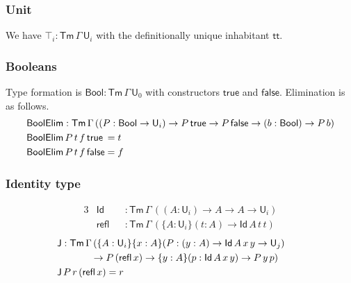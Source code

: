 \documentclass[acmsmall,screen,review]{acmart}
\newcommand{\msf}[1]{{\mathsf{#1}}}
\newcommand{\U}{\msf{U}}
\newcommand{\ttt}{\msf{tt}}
\newcommand{\Bool}{\msf{Bool}}
\newcommand{\Tm}{\msf{Tm}}
\newcommand{\true}{\msf{true}}
\newcommand{\false}{\msf{false}}
\newcommand{\BoolElim}{\msf{BoolElim}}
\newcommand{\Id}{\msf{Id}}
\newcommand{\refl}{\msf{refl}}
\newcommand{\J}{\msf{J}}
\begin{document}
\subsubsection{Unit} We have $\top_i : \Tm\,\Gamma\,\U_i$ with the definitionally unique inhabitant $\ttt$.

\subsubsection{Booleans} Type formation is $\Bool : \Tm\,\Gamma\,\U_0$ with constructors $\true$ and $\false$. Elimination is as follows.
\begin{alignat*}{3}
  &\BoolElim : \Tm\,\Gamma\,((P : \Bool \to \U_i) \to P\,\true \to P\,\false \to (b : \Bool) \to P\,b)\\
  & \BoolElim\,P\,t\,f\,\true\hspace{0.2em} = t\\
  & \BoolElim\,P\,t\,f\,\false = f
\end{alignat*}

\subsubsection{Identity type}
\begin{alignat*}{3}
  &\Id   &&: \Tm\,\Gamma\,((A : \U_i) \to A \to A \to \U_i)\\
  &\refl &&: \Tm\,\Gamma\,(\{A : \U_i\}(t : A) \to \Id\,A\,t\,t)
\end{alignat*}
\begin{alignat*}{3}
  &\J : \Tm\,\Gamma\,(\{A : \U_i\}\{x : A\}(P : (y : A) \to \Id\,A\,x\,y \to \U_j)\\
  & \hspace{3.5em}\to P\,(\refl\,x) \to \{y : A\}(p : \Id\,A\,x\,y) \to P\,y\,p)&&
  &\\
  &\J\,P\,r\,(\refl\,x) = r
\end{alignat*}
\end{document}
